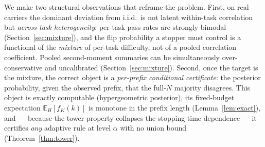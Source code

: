 \documentclass{article}
\theoremstyle{definition}
\theoremstyle{remark}
\newcommand{\E}{\mathbb{E}}
\begin{document}
We make two structural observations that reframe the problem. First, on real
carriers the dominant deviation from i.i.d.\ is not latent within-task
correlation but \emph{across-task heterogeneity}: per-task pass rates are
strongly bimodal (Section~\ref{sec:mixture}), and the flip probability a
stopper must control is a functional of the \emph{mixture} of per-task
difficulty, not of a pooled correlation coefficient. Pooled second-moment
summaries can be simultaneously over-conservative and uncalibrated
(Section~\ref{sec:mixture}). Second, once the target is the mixture, the
correct object is a \emph{per-prefix conditional certificate}: the posterior
probability, given the observed prefix, that the full-$N$ majority disagrees.
This object is exactly computable (hypergeometric posterior), its
fixed-budget expectation $\E_H[f_K(k)]$ is monotone in the prefix
length (Lemma~\ref{lem:exact}), and --- because the tower property
collapses the stopping-time
dependence --- it certifies \emph{any} adaptive rule at level $\alpha$ with no
union bound (Theorem~\ref{thm:tower}).
\end{document}
